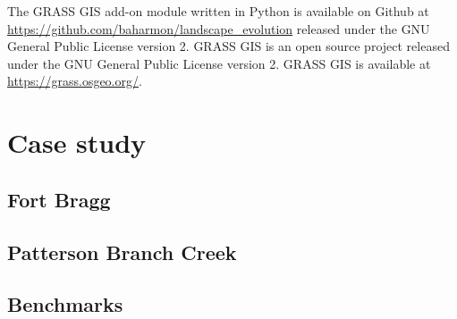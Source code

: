\documentclass[final,3p,times,twocolumn]{elsarticle}
\begin{document}
The GRASS GIS add-on module written in Python
is available on Github at \url{https://github.com/baharmon/landscape_evolution} released under the GNU General Public License version 2. 
GRASS GIS is an open source project released under the GNU General Public License version 2. GRASS GIS is available at \url{https://grass.osgeo.org/}. 


\clearpage
\section{Case study}
\subsection{Fort Bragg}
\subsection{Patterson Branch Creek}
\subsection{Benchmarks}

\end{document}
